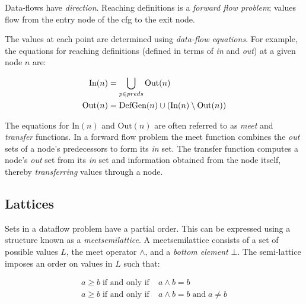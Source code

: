\documentclass[bsc,twoside,singlespacing,parskip,logo,notimes,normalheadings]{infthesis}
\begin{document}
        Data-flows have {\em direction}. Reaching definitions is a
        {\em forward flow problem}; values flow from the entry node of
        the \gls{cfg} to the exit node.

        The values at each point are determined using {\em data-flow
          equations}. For example, the equations for reaching
        definitions (defined in terms of {\em in} and {\em out}) at a
        given node $n$ are:
        
        \vspace{-7mm}
        \begin{align*}
          \textnormal{In}(n)  & = \bigcup_{p \in preds} \textnormal{Out}(n) \\
          \textnormal{Out}(n) & = \textnormal{DefGen}(n) \cup (\textnormal{In}(n) \setminus \textnormal{Out}(n))
        \end{align*}
        
        The equations for $\text{In}(n)$ and $\text{Out}(n)$ are often
        referred to as {\em \gls{meet}} and {\em \gls{transfer}}
        functions. In a forward flow problem the meet function
        combines the {\em out} sets of a node's predecessors to form
        its {\em in} set. The \gls{transfer} function computes a
        node's {\em out} set from its {\em in} set and information
        obtained from the node itself, thereby {\em transferring}
        values through a node.

	\subsection{Lattices}
	Sets in a \gls{dataflow} problem have a partial order. This
        can be expressed using a structure known as a {\em
          \gls{meetsemilattice}}. A \gls{meetsemilattice} consists of
        a set of possible values $L$, the meet operator $\land$, and a
        {\em bottom element} $\bot$. The semi-lattice imposes an order
        on values in $L$ such that:
        
        \vspace{-1cm}
        \begin{align*}
          a \geq b \;\text{if and only if}\; & a \land b = b \\
          a \ge  b \;\text{if and only if}\; & a \land b = b \;\text{and}\; a \neq b
        \end{align*}
        \vspace{-1cm}
        
\end{document}
